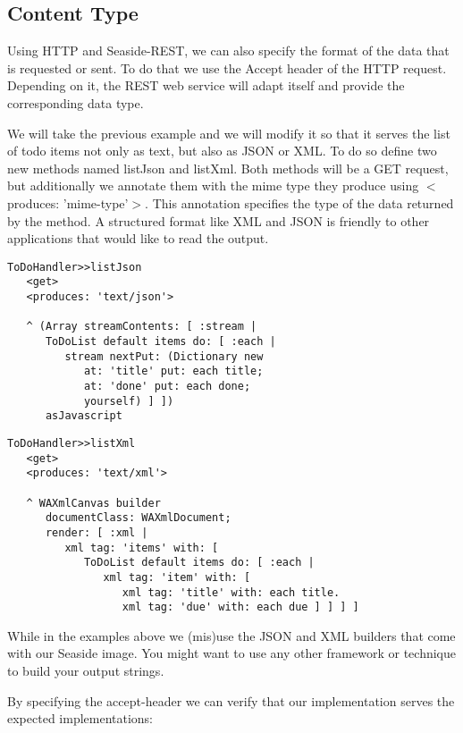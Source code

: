 \documentclass[a4paper,10pt,twoside]{book}
\newcommand{\ct}[1]{{\small\ttfamily\textup{#1}}}
\begin{document}
\subsection{Content Type}
\label{book:advanced:restful:matching:contenttype}

Using HTTP and Seaside-REST, we can also specify the format of the data that is requested or sent. To do that we use the \ct{Accept} header of the HTTP request. Depending on it, the REST web service will adapt itself and provide the corresponding data type. 
 
 We will take the previous example and we will modify it so that it serves the list of todo items not only as text, but also as JSON or XML. To do so define two new methods named \ct{listJson} and \ct{listXml}. Both methods will be a GET request, but additionally we annotate them with the mime type they produce using \ct{$<$produces: 'mime-type'$>$}. This annotation specifies the type of the data returned by the method. A structured format like XML and JSON is friendly to other applications that would like to read the output.

\begin{lstlisting}
ToDoHandler>>listJson
   <get>
   <produces: 'text/json'>
   
   ^ (Array streamContents: [ :stream |
      ToDoList default items do: [ :each |
         stream nextPut: (Dictionary new
            at: 'title' put: each title;
            at: 'done' put: each done;
            yourself) ] ])
      asJavascript
\end{lstlisting}

\begin{lstlisting}
ToDoHandler>>listXml
   <get>
   <produces: 'text/xml'>

   ^ WAXmlCanvas builder 
      documentClass: WAXmlDocument;
      render: [ :xml |
         xml tag: 'items' with: [ 
            ToDoList default items do: [ :each |
               xml tag: 'item' with: [
                  xml tag: 'title' with: each title.
                  xml tag: 'due' with: each due ] ] ] ]
\end{lstlisting}

While in the examples above we (mis)use the JSON and XML builders that come with our Seaside image. You might want to use any other framework or technique to build your output strings.

By specifying the accept-header we can verify that our implementation serves the expected implementations:
\end{document}
